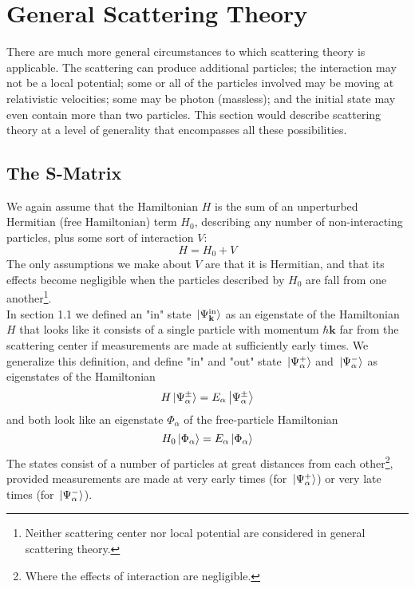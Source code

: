 \documentclass[12pt]{article}
\numberwithin{equation}{section}
\begin{document}
\section{General Scattering Theory}
There are much more general circumstances to which scattering theory is applicable.
The scattering can produce additional particles; the interaction may not be a local potential; some or all of the particles involved may be moving at relativistic velocities; some may be photon (massless); and the initial state may even contain more than two particles.
This section would describe scattering theory at a level of generality that encompasses all these possibilities.
\subsection{The S-Matrix}
We again assume that the Hamiltonian $H$ is the sum of an unperturbed Hermitian (free Hamiltonian) term $H_0$, describing any number of non-interacting particles, plus some sort of interaction $V$:
\begin{equation}
    H = H_0 + V
\end{equation}
The only assumptions we make about $V$ are that it is Hermitian, and that its effects become negligible when the particles described by $H_0$ are fall from one another\footnote{Neither scattering center nor local potential are considered in general scattering theory.}.
\\\indent In section 1.1 we defined an "in" state $\ket*{\Psi_{\mathbf{k}}^{\text{in}}}$ as an eigenstate of the Hamiltonian $H$ that looks like it consists of a single particle with momentum $\hbar\mathbf{k}$ far from the scattering center if measurements are made at sufficiently early times.
We generalize this definition, and define "in" and "out" state $\ket*{\Psi_{\alpha}^{+}}$ and $\ket*{\Psi_{\alpha}^{-}}$ as eigenstates of the Hamiltonian
\begin{equation}
    H\ket*{\Psi_{\alpha}^{\pm}} = E_{\alpha}\ket{\Psi_{\alpha}^{\pm}}
\end{equation}
and both look like an eigenstate $\Phi_{\alpha}$ of the free-particle Hamiltonian
\begin{equation}
    H_0\ket*{\Phi_{\alpha}} = E_{\alpha}\ket*{\Phi_{\alpha}}
\end{equation}
The states consist of a number of particles at great distances from each other\footnote{Where the effects of interaction are negligible.}, provided measurements are made at very early times (for $\ket*{\Psi_{\alpha}^{+}}$) or very late times (for $\ket*{\Psi_{\alpha}^{-}}$).
\end{document}
